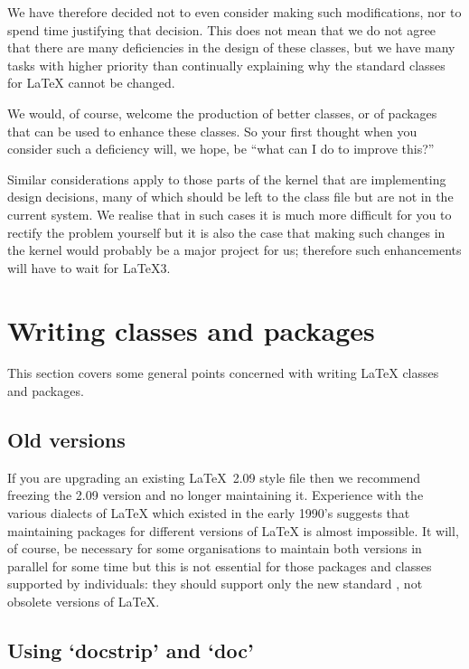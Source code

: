 \documentclass{ltxguide}[1995/11/28]
\begin{document}
We have therefore decided not to even consider making such
modifications, nor to spend time justifying that decision.  This does
not mean that we do not agree that there are many deficiencies in the
design of these classes, but we have many tasks with higher priority
than continually explaining why the standard classes for \LaTeX{}
cannot be changed.

We would, of course, welcome the production of better classes, or of
packages that can be used to enhance these classes.  So your first
thought when you consider such a deficiency will, we hope, be ``what
can I do to improve this?''

Similar considerations apply to those parts of the kernel that are
implementing design decisions, many of which should be left to the
class file but are not in the current system.  We realise that in such
cases it is much more difficult for you to rectify the problem
yourself but it is also the case that making such changes in the
kernel would probably be a major project for us; therefore such
enhancements will have to wait for \LaTeX3.

\section{Writing classes and packages}
\label{Sec:writing}

This section covers some general points concerned with writing
\LaTeX{} classes and packages.


\subsection{Old versions}

If you are upgrading an existing \LaTeX~2.09 style file then we
recommend freezing the 2.09 version and no longer maintaining it.
Experience with the various dialects of \LaTeX{} which existed in the
early 1990's suggests that maintaining packages for different versions
of \LaTeX{} is almost impossible.  It will, of course, be necessary
for some organisations to maintain both versions in parallel for some
time but this is not essential for those packages and classes
supported by individuals: they should support only the new standard
\LaTeXe{}, not obsolete versions of \LaTeX{}.


\subsection{Using `docstrip' and `doc'}
\end{document}

